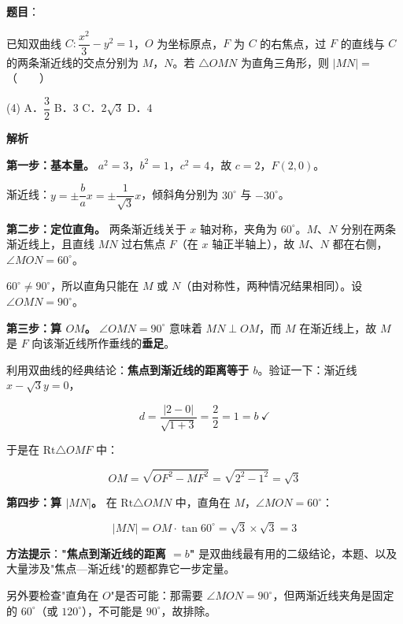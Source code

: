\begin{answer}

\textbf{题目}：

已知双曲线 $C:\dfrac{x^{2}}3-y^{2}=1$，$O$ 为坐标原点，$F$ 为 $C$ 的右焦点，过 $F$ 的直线与 $C$ 的两条渐近线的交点分别为 $M$，$N$。若 $\triangle OMN$ 为直角三角形，则 $|MN|=$\mbox{（　　）}

\begin{gkopts}(4)
\task A．$\dfrac32$
\task B．$3$
\task C．$2\sqrt3$
\task D．$4$
\end{gkopts}

\textbf{解析}

\textbf{第一步：基本量。} $a^{2}=3$，$b^{2}=1$，$c^{2}=4$，故 $c=2$，$F(2,0)$。

渐近线：$y=\pm\dfrac{b}{a}x=\pm\dfrac1{\sqrt3}x$，倾斜角分别为 $30^\circ$ 与 $-30^\circ$。

\textbf{第二步：定位直角。} 两条渐近线关于 $x$ 轴对称，夹角为 $60^\circ$。$M$、$N$ 分别在两条渐近线上，且直线 $MN$ 过右焦点 $F$（在 $x$ 轴正半轴上），故 $M$、$N$ 都在右侧，$\angle MON=60^\circ$。

$60^\circ\ne90^\circ$，所以直角只能在 $M$ 或 $N$（由对称性，两种情况结果相同）。设 $\angle OMN=90^\circ$。

\textbf{第三步：算 $OM$。} $\angle OMN=90^\circ$ 意味着 $MN\perp OM$，而 $M$ 在渐近线上，故 $M$ 是 $F$ 向该渐近线所作垂线的\textbf{垂足}。

利用双曲线的经典结论：\textbf{焦点到渐近线的距离等于 $b$}。验证一下：渐近线 $x-\sqrt3y=0$，

\nopagebreak[4]
\[d=\frac{|2-0|}{\sqrt{1+3}}=\frac22=1=b\ \checkmark\]

于是在 $\mathrm{Rt}\triangle OMF$ 中：

\nopagebreak[4]
\[OM=\sqrt{OF^{2}-MF^{2}}=\sqrt{2^{2}-1^{2}}=\sqrt3\]

\textbf{第四步：算 $|MN|$。} 在 $\mathrm{Rt}\triangle OMN$ 中，直角在 $M$，$\angle MON=60^\circ$：

\nopagebreak[4]
\[|MN|=OM\cdot\tan60^\circ=\sqrt3\times\sqrt3=3\]

\begin{gktip}
\textbf{方法提示}：\textbf{"焦点到渐近线的距离 $=b$"} 是双曲线最有用的二级结论，本题、以及大量涉及"焦点—渐近线"的题都靠它一步定量。

另外要检查"直角在 $O$"是否可能：那需要 $\angle MON=90^\circ$，但两渐近线夹角是固定的 $60^\circ$（或 $120^\circ$），不可能是 $90^\circ$，故排除。
\end{gktip}


\par\medskip

\end{answer}
